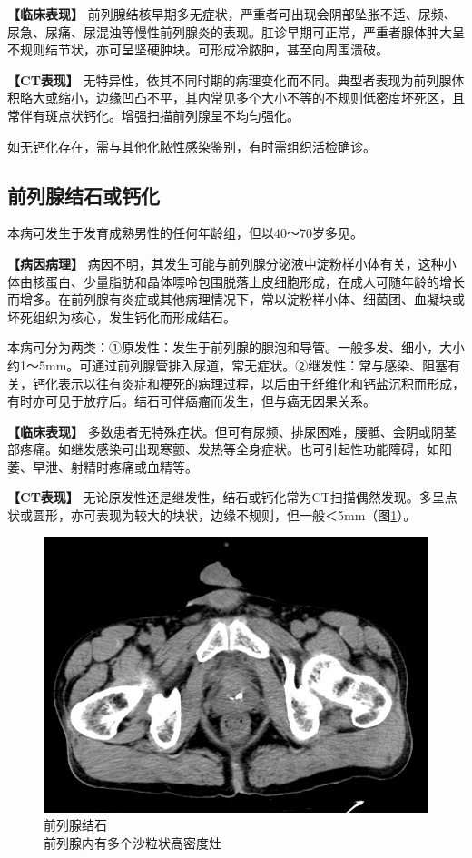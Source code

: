 \textbf{【临床表现】}
前列腺结核早期多无症状，严重者可出现会阴部坠胀不适、尿频、尿急、尿痛、尿混浊等慢性前列腺炎的表现。肛诊早期可正常，严重者腺体肿大呈不规则结节状，亦可呈坚硬肿块。可形成冷脓肿，甚至向周围溃破。

\textbf{【CT表现】}
无特异性，依其不同时期的病理变化而不同。典型者表现为前列腺体积略大或缩小，边缘凹凸不平，其内常见多个大小不等的不规则低密度坏死区，且常伴有斑点状钙化。增强扫描前列腺呈不均匀强化。

如无钙化存在，需与其他化脓性感染鉴别，有时需组织活检确诊。

\subsection{前列腺结石或钙化}

本病可发生于发育成熟男性的任何年龄组，但以40～70岁多见。

\textbf{【病因病理】}
病因不明，其发生可能与前列腺分泌液中淀粉样小体有关，这种小体由核蛋白、少量脂肪和晶体嘌呤包围脱落上皮细胞形成，在成人可随年龄的增长而增多。在前列腺有炎症或其他病理情况下，常以淀粉样小体、细菌团、血凝块或坏死组织为核心，发生钙化而形成结石。

本病可分为两类：①原发性：发生于前列腺的腺泡和导管。一般多发、细小，大小约1～5mm。可通过前列腺管排入尿道，常无症状。②继发性：常与感染、阻塞有关，钙化表示以往有炎症和梗死的病理过程，以后由于纤维化和钙盐沉积而形成，有时亦可见于放疗后。结石可伴癌瘤而发生，但与癌无因果关系。

\textbf{【临床表现】}
多数患者无特殊症状。但可有尿频、排尿困难，腰骶、会阴或阴茎部疼痛。如继发感染可出现寒颤、发热等全身症状。也可引起性功能障碍，如阳萎、早泄、射精时疼痛或血精等。

\textbf{【CT表现】}
无论原发性还是继发性，结石或钙化常为CT扫描偶然发现。多呈点状或圆形，亦可表现为较大的块状，边缘不规则，但一般＜5mm（图\ref{fig21-2}）。

\begin{figure}[!htbp]
 \centering
 \includegraphics[width=.7\textwidth,height=\textheight,keepaspectratio]{./images/Image00398.jpg}
 \captionsetup{justification=centering}
 \caption{前列腺结石\\{\small 前列腺内有多个沙粒状高密度灶}}
 \label{fig21-2}
  \end{figure} 

